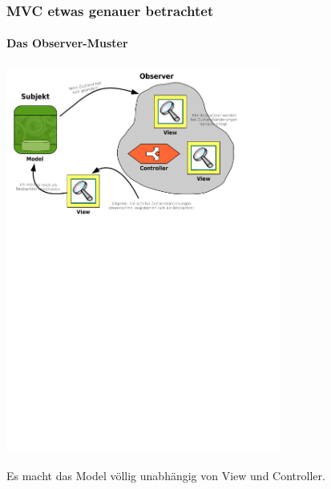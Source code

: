 \begin{frame}
	\frametitle{MVC etwas genauer betrachtet}
	\framesubtitle{Das Observer-Muster}
	\begin{center}
		\includegraphics[trim = 0mm 176.8mm 28.6mm 0mm, clip, width=9cm]{../mvc/observer-schema.pdf}
	\end{center}
	\begin{center}
		Es macht das Model völlig unabhängig von View und Controller.
	\end{center}	
\end{frame}

